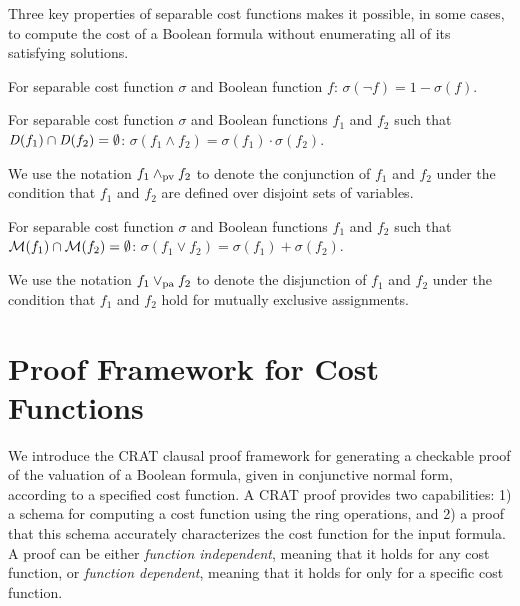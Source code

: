 \documentclass{llncs}
\newcommand{\pand}{\mathbin{\land_{\rm pv}}}
\newcommand{\por}{\mathbin{\lor_{\rm pa}}}
\newcommand{\interpset}[1]{{\cal M}(#1)}
\newcommand{\cost}{\sigma}
\newcommand{\depend}{{\it D}}
\begin{document}
Three key properties of separable cost functions makes it possible, in
some cases, to compute the cost of a Boolean formula without
enumerating all of its satisfying solutions.


\begin{lemma}[Complementation]
\label{lemma:complementation}
  For separable cost function $\cost$ and Boolean function $f$:
  $\cost(\neg f) = 1 - \cost(f)$.
\end{lemma}

\begin{lemma}
\label{lemma:conjunction}
  For separable cost function $\cost$ and Boolean functions $f_1$ and $f_2$ such that $\depend(f_1) \cap \depend(f_2) = \emptyset$:
    $\cost(f_1 \land f_2) = \cost(f_1) \cdot \cost(f_2)$.
\end{lemma}
We use the notation $f_1 \pand f_2$ to denote the conjunction of $f_1$ and
$f_2$ under the condition that $f_1$ and $f_2$ are defined over
disjoint sets of variables.

\begin{lemma}
\label{lemma:disjunction}
  For separable cost function $\cost$ and Boolean functions $f_1$ and $f_2$ such that $\interpset{f_1} \cap \interpset{f_2} = \emptyset$:
    $\cost(f_1 \lor f_2) = \cost(f_1) + \cost(f_2)$.
\end{lemma}
We use the notation $f_1 \por f_2$ to denote the disjunction of $f_1$ and $f_2$ under the
condition that $f_1$ and $f_2$ hold for mutually exclusive assignments.

\section{Proof Framework for Cost Functions}

We introduce the CRAT clausal proof framework for generating a
checkable proof of the valuation of a Boolean formula, given in
conjunctive normal form, according to a specified cost function.  A
CRAT proof provides two capabilities: 1) a schema for computing a cost
function using the ring operations, and 2) a proof that this schema
accurately characterizes the cost function for the input formula.
A proof can be either {\em function independent}, meaning that it holds
for any cost function, or {\em function dependent}, meaning that
it holds for only for a specific cost function.
\end{document}
